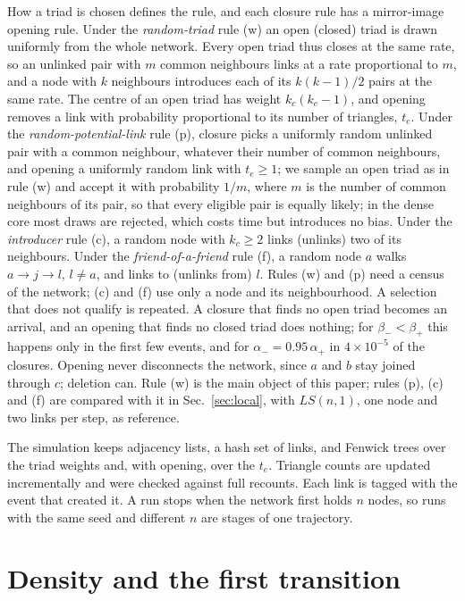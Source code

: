 \documentclass[aps,pre,twocolumn,superscriptaddress,floatfix,nofootinbib]{revtex4-2}
\begin{document}
How a triad is chosen defines the rule, and each closure rule has a
mirror-image opening rule. Under the \emph{random-triad} rule (w) an open
(closed) triad is drawn uniformly from the whole network. Every open triad
thus closes at the same rate, so an unlinked pair with $m$ common neighbours
links at a rate proportional to $m$, and a node with $k$ neighbours introduces
each of its $k(k-1)/2$ pairs at the same rate. The centre of an open triad has
weight $k_c(k_c-1)$, and opening removes a link with probability proportional
to its number of triangles, $t_e$. Under the \emph{random-potential-link} rule
(p), closure picks a uniformly random unlinked pair with a common neighbour,
whatever their number of common neighbours, and opening a uniformly random link
with $t_e\ge1$; we sample an open triad as in rule (w) and accept it with
probability $1/m$, where $m$ is the number of common neighbours of its pair, so
that every eligible pair is equally likely; in the dense core most draws are
rejected, which costs time but introduces no bias. Under the \emph{introducer} rule (c), a
random node with $k_c\ge2$ links (unlinks) two of its neighbours. Under the
\emph{friend-of-a-friend} rule (f), a random node $a$ walks $a\to j\to l$,
$l\ne a$, and links to (unlinks from) $l$. Rules (w) and (p) need a census of
the network; (c) and (f) use only a node and its neighbourhood. A selection
that does not qualify is repeated. A closure that finds no open triad becomes
an arrival, and an opening that finds no closed triad does nothing; for
$\beta_-<\beta_+$ this happens only in the first few events, and for
$\alpha_-=0.95\,\alpha_+$ in $4\times10^{-5}$ of the closures. Opening
never disconnects the network, since $a$ and $b$ stay joined through $c$;
deletion can. Rule (w) is the main object of this paper; rules (p), (c) and (f)
are compared with it in Sec.~\ref{sec:local}, with $LS(n,1)$, one node and two
links per step, as reference.

The simulation keeps adjacency lists, a hash set of links, and Fenwick trees
over the triad weights and, with opening, over the $t_e$. Triangle counts are
updated incrementally and were checked against full recounts. Each link is
tagged with the event that created it. A run stops when the network first holds
$n$ nodes, so runs with the same seed and different $n$ are stages of one
trajectory.

\section{Density and the first transition}
\label{sec:density}
\end{document}
